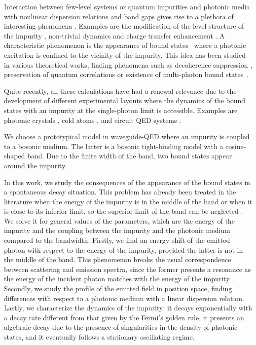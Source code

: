 \documentclass[aps,pra,twocolumn,floatfix,superscriptaddress]{revtex4-1}%
\begin{document}
Interaction between few-level systems or quantum impurities and photonic media with nonlinear dispersion relations and band gaps gives rise to a plethora of interesting phenomena \cite{Lambropoulos2000}. Examples are the modification of the level structure of the impurity \cite{John1990,John1991,Ripoll2015}, non-trivial dynamics \cite{Khalfin1958,Fonda1978,Hack1982,John1994,Gaveau1995,Garmon2013,Redchenko2014} and charge transfer enhancement \cite{Tanaka2006}. %
A characteristic phenomenon is the appearance of bound states\ \cite{John1984,John1987} where a photonic excitation is confined to the vicinity of the impurity. This idea has been studied in various theoretical works, finding phenomena such as decoherence suppression \cite{Tong2010a}, preservation of quantum correlations \cite{Tong2010b,Yang2013,Lu2013} or existence of multi-photon bound states\ \cite{Cirac2015,Calajo2016}. {\color{blue}Quite recently, all these calculations have had a renewal relevance due to the development of different experimental layouts where the dynamics of the bound states with an impurity at the single-photon limit is accessible. Examples are photonic crystals \cite{Arcari2014,Sollner2015,Lodahl2015}, cold atoms \cite{goban2015,thompson2013}, and circuit QED systems \cite{Astafiev2010,Hoi2011,Hoi2013,VanLoo2013,Hoi2013b,liu2016}.

We choose a prototypical model in waveguide-QED where an impurity is coupled to a bosonic medium. The latter is a bosonic tight-binding model with a cosine-shaped band. Due to the finite width of the band, two bound states appear around the impurity. 

In this work, we study the consequences of the appearance of the bound states in a spontaneous decay situation. This problem has already been treated in the literature when the energy of the impurity is in the middle of the band \cite{Lombardo2014} or when it is close to its inferior limit, so the superior limit of the band can be neglected \cite{Garmon2013}. We solve it for general values of the parameters, which are the energy of the impurity and the coupling between the impurity and the photonic medium compared to the bandwidth. Firstly, we find an energy shift of the emitted photon with respect to the energy of the impurity, provided the latter is not in the middle of the band. This phenomenon breaks the usual correspondence between scattering and emission spectra, since the former presents a resonance as the energy of the incident photon matches with the energy of the impurity \cite{Nori2008a, Fan2005a, Fan2005b}. Secondly, we study the profile of the emitted field in position space, finding differences with respect to a photonic medium with a linear dispersion relation. Lastly, we characterize the dynamics of the impurity: it decays exponentially with a decay rate different from that given by the Fermi's golden rule, it presents an algebraic decay due to the presence of singularities in the density of photonic states, and it eventually follows a stationary oscillating regime.}
\end{document}
